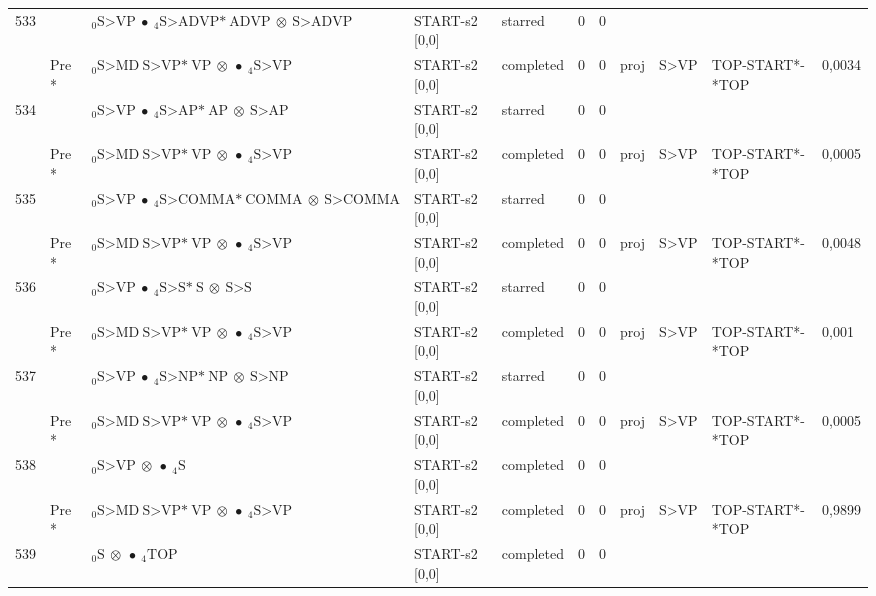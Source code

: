 \documentclass[10pt]{article}
\begin{document}
\begin{longtable}[htbp]{lllllllllll}
533 & & $ {}_0 \textrm{S>VP} \  \bullet \ {}_{4} \textrm{S>ADVP*} \ \textrm{ADVP} \  \otimes \ \textrm{S>ADVP} $ & START-s2 [0,0] & starred & 0 & 0 & & & & \\ 
 & Pre *& $ {}_0 \textrm{S>MD} \ \textrm{S>VP*} \ \textrm{VP} \  \otimes \  \bullet \ {}_{4} \textrm{S>VP} $ & START-s2 [0,0] & completed & 0 & 0 & proj & S>VP & TOP-START*-*TOP & 0,0034 \\ 
534 & & $ {}_0 \textrm{S>VP} \  \bullet \ {}_{4} \textrm{S>AP*} \ \textrm{AP} \  \otimes \ \textrm{S>AP} $ & START-s2 [0,0] & starred & 0 & 0 & & & & \\ 
 & Pre *& $ {}_0 \textrm{S>MD} \ \textrm{S>VP*} \ \textrm{VP} \  \otimes \  \bullet \ {}_{4} \textrm{S>VP} $ & START-s2 [0,0] & completed & 0 & 0 & proj & S>VP & TOP-START*-*TOP & 0,0005 \\ 
535 & & $ {}_0 \textrm{S>VP} \  \bullet \ {}_{4} \textrm{S>COMMA*} \ \textrm{COMMA} \  \otimes \ \textrm{S>COMMA} $ & START-s2 [0,0] & starred & 0 & 0 & & & & \\ 
 & Pre *& $ {}_0 \textrm{S>MD} \ \textrm{S>VP*} \ \textrm{VP} \  \otimes \  \bullet \ {}_{4} \textrm{S>VP} $ & START-s2 [0,0] & completed & 0 & 0 & proj & S>VP & TOP-START*-*TOP & 0,0048 \\ 
536 & & $ {}_0 \textrm{S>VP} \  \bullet \ {}_{4} \textrm{S>S*} \ \textrm{S} \  \otimes \ \textrm{S>S} $ & START-s2 [0,0] & starred & 0 & 0 & & & & \\ 
 & Pre *& $ {}_0 \textrm{S>MD} \ \textrm{S>VP*} \ \textrm{VP} \  \otimes \  \bullet \ {}_{4} \textrm{S>VP} $ & START-s2 [0,0] & completed & 0 & 0 & proj & S>VP & TOP-START*-*TOP & 0,001 \\ 
537 & & $ {}_0 \textrm{S>VP} \  \bullet \ {}_{4} \textrm{S>NP*} \ \textrm{NP} \  \otimes \ \textrm{S>NP} $ & START-s2 [0,0] & starred & 0 & 0 & & & & \\ 
 & Pre *& $ {}_0 \textrm{S>MD} \ \textrm{S>VP*} \ \textrm{VP} \  \otimes \  \bullet \ {}_{4} \textrm{S>VP} $ & START-s2 [0,0] & completed & 0 & 0 & proj & S>VP & TOP-START*-*TOP & 0,0005 \\ 
538 & & $ {}_0 \textrm{S>VP} \  \otimes \  \bullet \ {}_{4} \textrm{S} $ & START-s2 [0,0] & completed & 0 & 0 & & & & \\ 
 & Pre *& $ {}_0 \textrm{S>MD} \ \textrm{S>VP*} \ \textrm{VP} \  \otimes \  \bullet \ {}_{4} \textrm{S>VP} $ & START-s2 [0,0] & completed & 0 & 0 & proj & S>VP & TOP-START*-*TOP & 0,9899 \\ 
539 & & $ {}_0 \textrm{S} \  \otimes \  \bullet \ {}_{4} \textrm{TOP} $ & START-s2 [0,0] & completed & 0 & 0 & & & & \\ 

\end{longtable}
\end{document}
